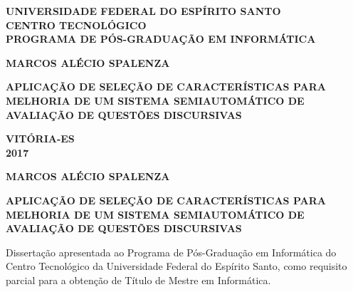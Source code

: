 \begin{titlepage}

\begin{center}
{\large \textbf{UNIVERSIDADE FEDERAL DO ESPÍRITO SANTO \\ CENTRO TECNOLÓGICO \\ PROGRAMA DE PÓS-GRADUAÇÃO EM INFORMÁTICA}}
\par
\vspace{120pt}
{\LARGE \textbf{MARCOS ALÉCIO SPALENZA}}

\par
\vspace{160pt}
{\LARGE \textbf{APLICAÇÃO DE SELEÇÃO DE CARACTERÍSTICAS PARA MELHORIA DE UM SISTEMA SEMIAUTOMÁTICO DE AVALIAÇÃO DE QUESTÕES DISCURSIVAS}}
\par
\vfill
\textbf{{\large VITÓRIA-ES}\\
{\large 2017}}
\end{center}
\end{titlepage}

\pagestyle{empty}
\cleardoublepage










\newpage
\begin{center}
{ \bfseries\fontsize{13}{15}\selectfont
{} }
\end{center}










\newpage
\begin{center}
{\LARGE \textbf{MARCOS ALÉCIO SPALENZA}}
\par
\vspace{200pt}
{\LARGE \textbf{APLICAÇÃO DE SELEÇÃO DE CARACTERÍSTICAS PARA MELHORIA DE UM SISTEMA SEMIAUTOMÁTICO DE AVALIAÇÃO DE QUESTÕES DISCURSIVAS}}
\end{center}
\par
\vspace{90pt}
\hspace*{175pt}\parbox{10cm}{{Dissertação apresentada ao Programa de Pós-Graduação em Informática do Centro Tecnológico da Universidade Federal do Espírito Santo, como requisito parcial para a obtenção de Título de Mestre em Informática.}}


